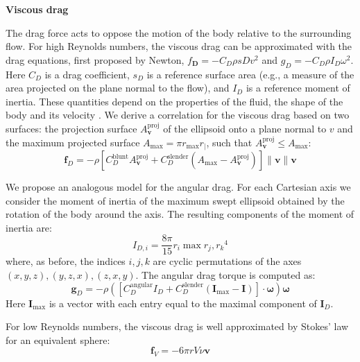 \documentclass[sn-mathphys-num]{sn-jnl}%
\theoremstyle{thmstyleone}%
\theoremstyle{thmstyletwo}%
\theoremstyle{thmstylethree}%
\begin{document}
\begin{appendices}
\textbf{Viscous drag}

The drag force acts to oppose the motion of the body relative to the surrounding flow. 
For high Reynolds numbers, the viscous drag can be approximated with the drag equations, first proposed by Newton, $ f_\mathbf{D} = - C_D \rho s D v^2 $ and $ g_D = -C_D \rho I_D \omega^2 $. 
Here $ C_D $ is a drag coefficient, $ s_D $ is a reference surface area (e.g., a measure of the area projected on the plane normal to the flow), and $ I_D $ is a reference moment of inertia. 
These quantities depend on the properties of the fluid, the shape of the body and its velocity \cite{duan2015sphere}. 
We derive a correlation for the viscous drag based on two surfaces: the projection surface $ A_\mathbf{v}^\text{proj} $ of the ellipsoid onto a plane normal to $ v $ and the maximum projected surface $ A_\text{max} = \pi r_{\max} r_{\mid} $, 
such that $ A_\mathbf{v}^{\text{proj}} \leq A_{\max} $:
%
\begin{equation}\label{key}
	\mathbf{f}_D = 
		- \rho
		[
			C_D^\text{blunt}  A_{\mathbf{v}}^\text{proj}
			+ C_D^\text{slender} (A_{\max} - A_\mathbf{v}^\text{proj})
		]
		\|
			\mathbf{v}
		\|
		\mathbf{v}
\end{equation}

We propose an analogous model for the angular drag. 
For each Cartesian axis we consider the moment of inertia of the maximum swept ellipsoid obtained by the rotation of the body around the axis. 
The resulting components of the moment of inertia are:
%
\begin{equation}\label{eq:inertial_moment}
	I_{D,i} = 
		\frac{8 \pi}{15}
		r_i
		\max {r_j, r_k}^4
\end{equation}
where, as before, the indices $ i, j, k $ are cyclic permutations of the axes $ (x, y, z), (y, z, x), (z, x, y) $. 
The angular drag torque is computed as:
%
\begin{equation}\label{key}
	\mathbf{g}_D = 
		- \rho
		(
			[ 
				C_D^\text{angular} I_D 
				+ C_D^\text{slender} (\mathbf{I}_{\max} - \mathbf{I})
			] \cdot \mathbf{\omega}
		) \mathbf{\omega}
\end{equation}
Here $ \mathbf{I}_{\max} $ is a vector with each entry equal to the maximal component of $ \mathbf{I}_D $.


For low Reynolds numbers, the viscous drag is well approximated by Stokes' law \cite{stokes1851effect} for an equivalent sphere:
\begin{equation}\label{eq:f_V}
	\mathbf{f}_V = 
		- 6 \pi r V \nu \mathbf{v}
\end{equation}


\end{appendices}
\end{document}
